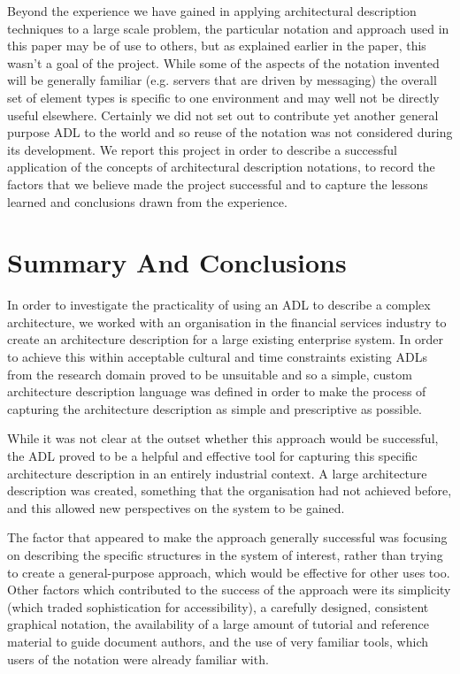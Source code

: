   Beyond the experience we have gained in applying architectural description techniques to a large scale problem, the particular notation and approach used in this paper may be of use to others, but as explained earlier in the paper, this wasn't a goal of the project. While some of the aspects of the notation invented will be generally familiar (e.g. servers that are driven by messaging) the overall set of element types is specific to one environment and may well not be directly useful elsewhere.  Certainly we did not set out to contribute yet another general purpose ADL to the world and so reuse of the notation was not considered during its development.  We report this project in order to describe a successful application of the concepts of architectural description notations, to record the factors that we believe made the project successful and to capture the lessons learned and conclusions drawn from the experience.

\section{Summary And Conclusions}

  In order to investigate the practicality of using an ADL to describe a complex architecture, we worked with an organisation in the financial services industry  to create an architecture description for a large existing enterprise system.  In order to achieve this within acceptable cultural and time constraints existing ADLs from the research domain proved to be unsuitable and so a simple, custom architecture description language was defined in order to make the process of capturing the architecture description as simple and prescriptive as possible.

  While it was not clear at the outset whether this approach would be successful, the ADL  proved to be a helpful and effective tool for capturing this specific architecture description in an entirely industrial context.  A large architecture description was created, something that the organisation had not achieved before, and this allowed new perspectives on the system to be gained.

  The factor that appeared to make the approach generally successful was focusing on describing the specific structures in the system of interest, rather than trying to create a general-purpose approach, which would be effective for other uses too.  Other factors which contributed to the success of the approach were its simplicity (which traded sophistication for accessibility), a carefully designed, consistent graphical notation, the availability of a large amount of tutorial and reference material to guide document authors, and the use of very familiar tools, which users of the notation were already familiar with.

